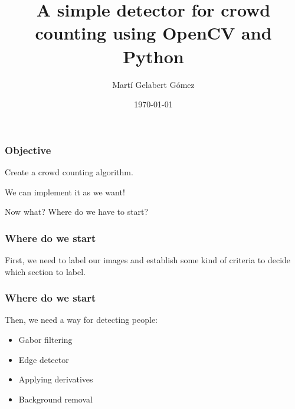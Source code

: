 \documentclass{beamer}
\title{A simple detector for crowd counting using OpenCV and Python}
\author{Martí Gelabert Gómez}
\institute{University of the Balearic Islands}
\date{\today}
\begin{document}
\frame{\titlepage}

\begin{frame}

    \frametitle{Objective}
    \centering
    Create a crowd counting algorithm.\newline \pause

    We can implement it as we want!\newline \pause

    Now what? Where do we have to start?

\end{frame}


\begin{frame}
    \frametitle{Where do we start}
    First, we need to label our images and establish some kind of criteria to decide which section to label. 
     
\end{frame}


\begin{frame}
    \frametitle{Where do we start}
    Then, we need a way for detecting people:
    \begin{itemize}
        \item<2-> Gabor filtering  
        \item<3-> Edge detector  
        \item<4-> Applying derivatives 
        \item<5-> Background removal  {\color{green} \checkmark}
    \end{itemize}
     
\end{frame}

\end{document}
